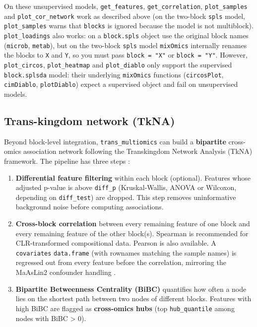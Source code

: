 \documentclass[
]{book}
\providecommand{\tightlist}{%
  \setlength{\itemsep}{0pt}\setlength{\parskip}{0pt}}
\begin{document}
On these unsupervised models, \texttt{get\_features}, \texttt{get\_correlation}, \texttt{plot\_samples} and \texttt{plot\_cor\_network} work as described above (on the two-block \texttt{spls} model, \texttt{plot\_samples} warns that \texttt{blocks} is ignored because the model is not multiblock).
\texttt{plot\_loadings} also works: on a \texttt{block.spls} object use the original block names (\texttt{microb}, \texttt{metab}), but on the two-block \texttt{spls} model \texttt{mixOmics} internally renames the blocks to \texttt{X} and \texttt{Y}, so you must pass \texttt{block\ =\ "X"} or \texttt{block\ =\ "Y"}.
However, \texttt{plot\_circos}, \texttt{plot\_heatmap} and \texttt{plot\_diablo} only support the supervised \texttt{block.splsda} model: their underlying \texttt{mixOmics} functions (\texttt{circosPlot}, \texttt{cimDiablo}, \texttt{plotDiablo}) expect a supervised object and fail on unsupervised models.

\subsection{Trans-kingdom network (TkNA)}\label{trans-kingdom-network-tkna}

Beyond block-level integration, \texttt{trans\_multiomics} can build a \textbf{bipartite} cross-omics association network following the Transkingdom Network Analysis (TkNA) framework.
The pipeline has three steps \citep{Newman_TkNA_2024}:

\begin{enumerate}
\def\labelenumi{\arabic{enumi}.}
\tightlist
\item
  \textbf{Differential feature filtering} within each block (optional).
  Features whose adjusted p-value is above \texttt{diff\_p} (Kruskal-Wallis, ANOVA or Wilcoxon, depending on \texttt{diff\_test}) are dropped.
  This step removes uninformative background noise before computing associations.
\item
  \textbf{Cross-block correlation} between every remaining feature of one block and every remaining feature of the other block(s).
  Spearman is recommended for CLR-transformed compositional data.
  Pearson is also available.
  A \texttt{covariates} \texttt{data.frame} (with rownames matching the sample names) is regressed out from every feature before the correlation, mirroring the MaAsLin2 confounder handling \citep{Mallick_MaAsLin2_2021}.
\item
  \textbf{Bipartite Betweenness Centrality (BiBC)} quantifies how often a node lies on the shortest path between two nodes of different blocks.
  Features with high BiBC are flagged as \textbf{cross-omics hubs} (top \texttt{hub\_quantile} among nodes with BiBC \textgreater{} 0).
\end{enumerate}
\end{document}
